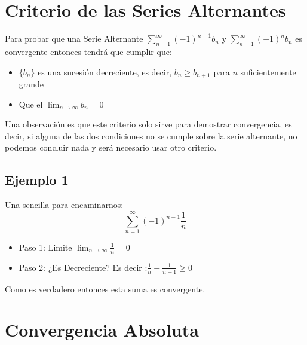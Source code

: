 \documentclass[12pt]{report}							    %
\begin{document}
    \section{Criterio de las Series Alternantes}

        Para probar que una Serie Alternante $\sum_{n=1}^{\infty} (-1)^{n-1} b_n$ y $\sum_{n=1}^{\infty} (-1)^n b_n$ es convergente entonces tendrá que cumplir que:

        \begin{itemize}
            \item $\{b_n\}$ es una sucesión decreciente, es decir, $b_n \geq b_{n+1}$ para $n$ suficientemente grande
            \item Que el $\lim_{n \to \infty} b_n = 0$
        \end{itemize}

        Una observación es que este criterio solo sirve para demostrar convergencia, es decir, si alguna de las dos condiciones no se cumple sobre la serie alternante, no podemos concluir nada y será necesario usar otro criterio.

        \subsection{Ejemplo 1}
        Una sencilla para encaminarnos:
        \begin{equation*}
            \sum_{n=1}^{\infty} (-1)^{n-1} \frac{1}{n}
        \end{equation*}


         \begin{itemize}
            \item Paso 1: Limite $\lim_{n \to \infty} \frac{1}{n}=0$
            \item Paso 2: ¿Es Decreciente? Es decir :$\frac{1}{n}-\frac{1}{n+1} \geq 0 $
         \end{itemize}

        Como es verdadero entonces esta suma es convergente.





    \clearpage
    \section{Convergencia Absoluta}
\end{document}
